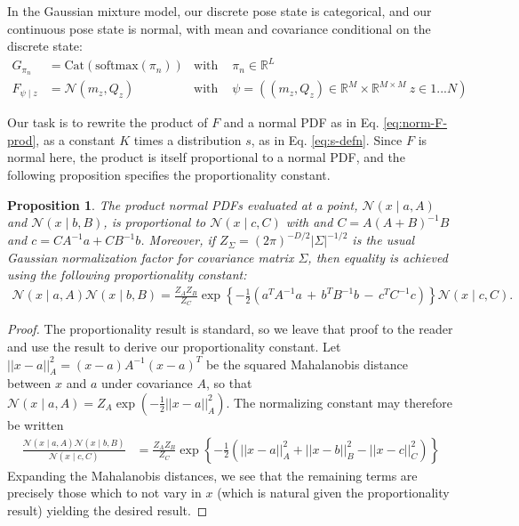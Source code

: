 \documentclass{article}         %
\newtheorem{proposition}{Proposition}[section]
\newcommand{\inv}{^{-1}}
\newcommand{\RR}{\mathbb{R}}
\newcommand{\NN}{\mathcal{N}}
\newcommand{\abs}[1]{\left| #1 \right|}
\newcommand{\norm}[1]{\left|\left| #1 \right|\right|}
\newcommand{\cb}[1]{\left\{ #1 \right\}}
\newcommand{\pn}[1]{\left( #1 \right)}
\begin{document}
In the Gaussian mixture model, our discrete pose state is categorical, and our continuous pose state is normal, with mean and covariance conditional on the discrete state:
\begin{align*}
    G_{\pi_n} &= \text{Cat}({\text{softmax}(\pi_n)}) & \text{with\ }&\pi_n \in \RR^L \\
    F_{\psi\mid z} &= \NN(m_z, Q_z) & \text{with\ }&\psi = ((m_z, Q_z) \in \RR^{M} \times \RR^{M\times M}\ z\in 1 ... N)
\end{align*}

Our task is to rewrite the product of $F$ and a normal PDF as in Eq. \ref{eq:norm-F-prod}, as a constant $K$ times a distribution $s$, as in Eq. \ref{eq:s-defn}. Since $F$ is normal here, the product is itself proportional to a normal PDF, and the following proposition specifies the proportionality constant.
\begin{proposition}
    The product normal PDFs evaluated at a point, $\NN(x\mid a, A)$ and $\NN(x\mid b, B)$, is proportional to $ \NN(x\mid c, C)$ with and $C = A\pn{A + B}\inv B$ and $c = CA\inv a + CB\inv b$. Moreover, if $Z_\Sigma = \pn{2\pi}^{-D/2}\abs{\Sigma}^{-1/2}$ is the usual Gaussian normalization factor for covariance matrix $\Sigma$, then equality is achieved using the following proportionality constant:
    \begin{align}
        \NN(x\mid a, A) \NN(x\mid b, B) = \frac{Z_AZ_B}{Z_C} \exp\cb{-\frac{1}{2}\pn{a^TA\inv a \,+\, b^TB\inv b \,-\, c^T C\inv c}} \NN(x\mid c, C).
    \end{align}
\end{proposition}
\begin{proof}
The proportionality result is standard, so we leave that proof to the reader and use the result to derive our proportionality constant. Let $\norm{x-a}^2_A = (x - a)A\inv (x - a)^T$ be the squared Mahalanobis distance between $x$ and $a$ under covariance $A$, so that $\NN(x\mid a, A) = Z_{A}\exp(-\frac{1}{2}\norm{x-a}^2_A)$. The normalizing constant may therefore be written
\begin{align}
    \frac{\NN(x\mid a, A)\NN(x\mid b, B)}{\NN(x\mid c, C)} &= \frac{Z_AZ_B}{Z_C} \exp\cb{-\frac{1}{2}\pn{\norm{x - a}^2_A + \norm{x - b}^2_B - \norm{x - c}^2_C}}
\end{align}
Expanding the Mahalanobis distances, we see that the remaining terms are precisely those which to not vary in $x$ (which is natural given the proportionality result) yielding the desired result.
\end{proof}
\end{document}

